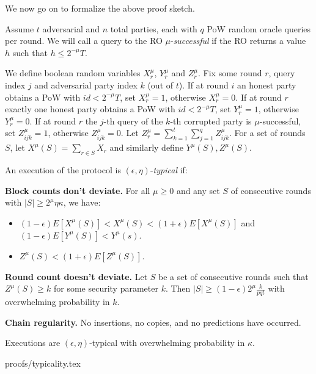 We now go on to formalize the above proof sketch.

Assume $t$ adversarial and $n$ total parties, each with $q$
PoW random oracle queries per round. We will call a query to the
RO $\mu$-\textit{successful} if the RO returns a value $h$
such that $h \leq 2^{-\mu}T$.

We define boolean random variables $X_r^\mu$, $Y_r^\mu$ and $Z_r^\mu$. Fix some
round $r$, query index $j$ and adversarial party index $k$ (out of $t$). If at
round $i$ an honest party obtains a PoW with $id < 2^{-\mu}T$, set $X_r^\mu =
1$, otherwise $X_r^\mu = 0$. If at round $r$ exactly one honest party obtains a
PoW with $id < 2^{-\mu}T$, set $Y_r^\mu = 1$, otherwise $Y_r^\mu = 0$. If at
round $r$ the $j$-th query of the $k$-th corrupted party is $\mu$-successful,
set $Z^\mu_{ijk} = 1$, otherwise $Z^\mu_{ijk} = 0$. Let $Z^\mu_r = \sum_{k=1}^t
\sum_{j=1}^q Z^\mu_{ijk}$. For a set of rounds $S$, let $X^\mu(S) = \sum_{r \in
S} X_r$ and similarly define $Y^\mu(S), Z^\mu(S)$.

\begin{definition} %
    An execution of the protocol is $(\epsilon, \eta)$-\textit{typical} if:

    \textnormal{\bf Block counts don't deviate.}
    For all $\mu \geq 0$ and any set $S$ of consecutive rounds
    with $|S| \geq 2^\mu \eta\kappa$, we have:

    \begin{itemize}
        \item $(1 - \epsilon)E[X^\mu(S)] < X^\mu(S) < (1 + \epsilon)E[X^\mu(S)]$ and $(1 - \epsilon)E[Y^\mu(S)] < Y^\mu(s)$.
        \item $Z^\mu(S) < (1 + \epsilon)E[Z^\mu(S)]$.
    \end{itemize}

    \textnormal{\bf Round count doesn't deviate.}
    Let $S$ be a set of consecutive rounds such that $Z^\mu(S)
    \geq k$ for some security parameter $k$. Then $|S| \geq (1 -
    \epsilon)2^\mu\frac{k}{pqt}$ with overwhelming probability in $k$.

    \textnormal{\bf Chain regularity.}
    No insertions, no copies, and no predictions \cite{backbone} have occurred.
\end{definition}

\begin{theorem}[Typicality]
\label{thm.typicality}
Executions are $(\epsilon, \eta)$-typical with overwhelming
probability in $\kappa$.
\end{theorem}
{proofs/typicality.tex}

